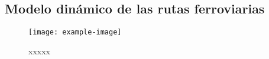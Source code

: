 \subsection{Modelo dinámico de las rutas ferroviarias}

\lipsum[1]

\begin{figure}[H]
	\centering
	\texttt{[image: example-image]}
	\centering\caption{xxxxx}
	\label{fig:XXXX}
\end{figure}

\lipsum[1]